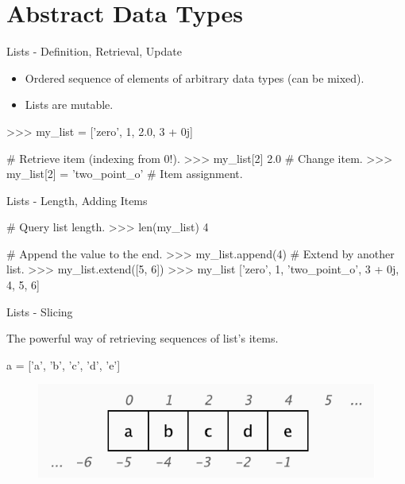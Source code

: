 \documentclass[10pt]{beamer}
\begin{document}
\section{Abstract Data Types}

\begin{frame}[fragile]{Lists - Definition, Retrieval, Update}
	\begin{itemize}
		\item \pause Ordered sequence of elements of arbitrary data types (can be mixed).
		\item \pause Lists are mutable.
	\end{itemize}
	
	\pause
	\begin{pythoncode}
	>>> my_list = ['zero', 1, 2.0, 3 + 0j] 
	\end{pythoncode}

	\begin{pythoncode}
		# Retrieve item (indexing from 0!).
		>>> my_list[2]  
		2.0
		# Change item.
		>>> my_list[2] = 'two_point_o'  # Item assignment. 
	\end{pythoncode}
\end{frame}

\begin{frame}[fragile]{Lists - Length, Adding Items}
	\begin{pythoncode}
		# Query list length.
		>>> len(my_list) 
		4
	\end{pythoncode}

	\pause
	\begin{pythoncode}
		# Append the value to the end.
		>>> my_list.append(4)  
		# Extend by another list.
		>>> my_list.extend([5, 6])  
		>>> my_list
		['zero', 1, 'two_point_o', 3 + 0j, 4, 5, 6]
	\end{pythoncode}
\end{frame}

\begin{frame}[fragile]{Lists - Slicing}
	
	The powerful way of retrieving sequences of list's items.
	
	\pause
	\begin{pythoncode}
		a = ['a', 'b', 'c', 'd', 'e']
	\end{pythoncode}
	
	\pause
	\begin{figure}[!h]
		\centering
		\includegraphics[width=0.6\linewidth]{img/slicing.pdf}		
	\end{figure}
\end{frame}
\end{document}
